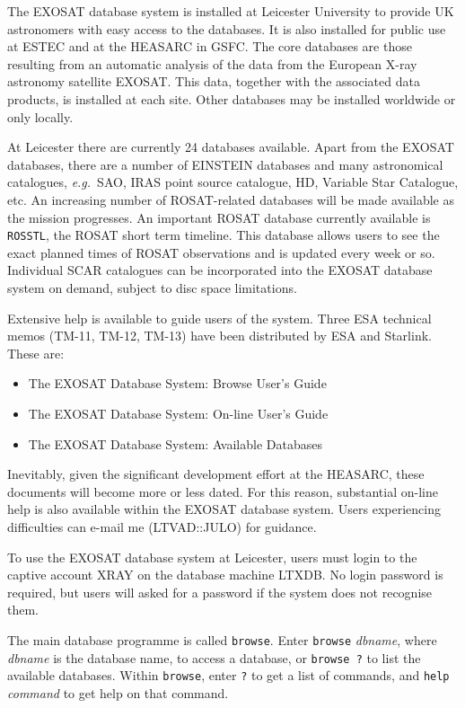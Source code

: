 The EXOSAT database system is installed at Leicester University to provide 
UK astronomers with easy access to the databases. It is also installed for 
public use at 
ESTEC and at the HEASARC in GSFC. The core databases are those resulting 
from an automatic analysis of the data from the European X-ray astronomy 
satellite EXOSAT. This data, together with the associated data products, is
installed at each site. Other databases may be installed worldwide or only 
locally. 

At Leicester there are currently 24 databases available. Apart from the 
EXOSAT databases, there are a number of EINSTEIN databases and many 
astronomical catalogues, {\it e.g.}~SAO, 
IRAS point source catalogue, HD, Variable Star Catalogue, etc. 
An increasing number of ROSAT-related 
databases will be made available as the mission progresses. An important 
ROSAT database currently available is {\tt ROSSTL}, 
the ROSAT short term timeline. 
This database allows users to see the exact planned times of ROSAT 
observations and is updated every week or so. Individual SCAR catalogues can 
be incorporated into the EXOSAT database system on demand, subject to disc 
space limitations.

Extensive help is available to guide users of the system. Three ESA 
technical memos (TM-11, TM-12, TM-13) have been distributed by ESA and 
Starlink. These are:
\begin{itemize}
\item The EXOSAT Database System: Browse User's Guide
\item The EXOSAT Database System: On-line User's Guide
\item The EXOSAT Database System: Available Databases
\end{itemize}
Inevitably, given the significant development effort at the HEASARC, these 
documents will become more or less dated. For this reason, substantial 
on-line help is also available within the EXOSAT database system. Users 
experiencing difficulties can e-mail me (LTVAD::JULO) for guidance.

To use the EXOSAT database system at Leicester, users must login to the  
captive account XRAY on the database machine LTXDB. No login password is 
required, but users will asked for a password if the system does not recognise 
them. 

The main database programme is called {\tt browse}. 
Enter {\tt browse} {\it dbname}, 
where {\it dbname} is the database name, to access a database, or {\tt browse ?}
to list the available databases. Within {\tt browse}, 
enter {\tt ?} to get a list 
of commands, and {\tt help} {\it command} to get help on that command. 

